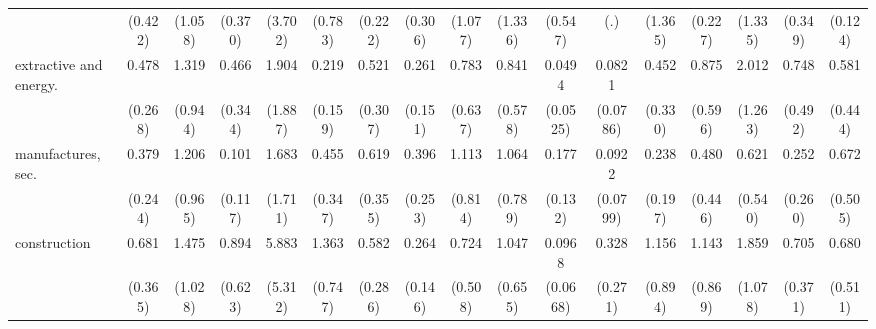 {\begin{tabular}{l*{16}{c}}
                    &     (0.422)         &     (1.058)         &     (0.370)         &     (3.702)         &     (0.783)         &     (0.222)         &     (0.306)         &     (1.077)         &     (1.336)         &     (0.547)         &         (.)         &     (1.365)         &     (0.227)         &     (1.335)         &     (0.349)         &     (0.124)         \\
[1em]
extractive and energy.&       0.478         &       1.319         &       0.466         &       1.904         &       0.219\sym{*}  &       0.521         &       0.261\sym{*}  &       0.783         &       0.841         &      0.0494\sym{**} &      0.0821\sym{**} &       0.452         &       0.875         &       2.012         &       0.748         &       0.581         \\
                    &     (0.268)         &     (0.944)         &     (0.344)         &     (1.887)         &     (0.159)         &     (0.307)         &     (0.151)         &     (0.637)         &     (0.578)         &    (0.0525)         &    (0.0786)         &     (0.330)         &     (0.596)         &     (1.263)         &     (0.492)         &     (0.444)         \\
[1em]
manufactures, sec.  &       0.379         &       1.206         &       0.101\sym{*}  &       1.683         &       0.455         &       0.619         &       0.396         &       1.113         &       1.064         &       0.177\sym{*}  &      0.0922\sym{**} &       0.238         &       0.480         &       0.621         &       0.252         &       0.672         \\
                    &     (0.244)         &     (0.965)         &     (0.117)         &     (1.711)         &     (0.347)         &     (0.355)         &     (0.253)         &     (0.814)         &     (0.789)         &     (0.132)         &    (0.0799)         &     (0.197)         &     (0.446)         &     (0.540)         &     (0.260)         &     (0.505)         \\
[1em]
construction        &       0.681         &       1.475         &       0.894         &       5.883\sym{*}  &       1.363         &       0.582         &       0.264\sym{*}  &       0.724         &       1.047         &      0.0968\sym{***}&       0.328         &       1.156         &       1.143         &       1.859         &       0.705         &       0.680         \\
                    &     (0.365)         &     (1.028)         &     (0.623)         &     (5.312)         &     (0.747)         &     (0.286)         &     (0.146)         &     (0.508)         &     (0.655)         &    (0.0668)         &     (0.271)         &     (0.894)         &     (0.869)         &     (1.078)         &     (0.371)         &     (0.511)         \\

\end{tabular}}
